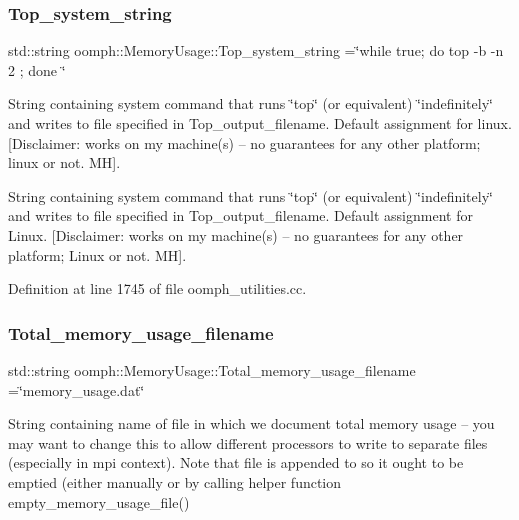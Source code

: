 \subsubsection{\texorpdfstring{Top\+\_\+system\+\_\+string}{Top\_system\_string}}
{\footnotesize\ttfamily std\+::string oomph\+::\+Memory\+Usage\+::\+Top\+\_\+system\+\_\+string =\char`\"{}while true; do top -\/b -\/n 2 ; done \char`\"{}}



String containing system command that runs \char`\"{}top\char`\"{} (or equivalent) \char`\"{}indefinitely\char`\"{} and writes to file specified in Top\+\_\+output\+\_\+filename. Default assignment for linux. \mbox{[}Disclaimer\+: works on my machine(s) -- no guarantees for any other platform; linux or not. MH\mbox{]}. 

String containing system command that runs \char`\"{}top\char`\"{} (or equivalent) \char`\"{}indefinitely\char`\"{} and writes to file specified in Top\+\_\+output\+\_\+filename. Default assignment for Linux. \mbox{[}Disclaimer\+: works on my machine(s) -- no guarantees for any other platform; Linux or not. MH\mbox{]}. 

Definition at line 1745 of file oomph\+\_\+utilities.\+cc.

\mbox{\label{namespaceoomph_1_1MemoryUsage_afd9a74c901df404ddb665921e408a3a3}} 
\subsubsection{\texorpdfstring{Total\+\_\+memory\+\_\+usage\+\_\+filename}{Total\_memory\_usage\_filename}}
{\footnotesize\ttfamily std\+::string oomph\+::\+Memory\+Usage\+::\+Total\+\_\+memory\+\_\+usage\+\_\+filename =\char`\"{}memory\+\_\+usage.\+dat\char`\"{}}



String containing name of file in which we document total memory usage -- you may want to change this to allow different processors to write to separate files (especially in mpi context). Note that file is appended to so it ought to be emptied (either manually or by calling helper function empty\+\_\+memory\+\_\+usage\+\_\+file() 



